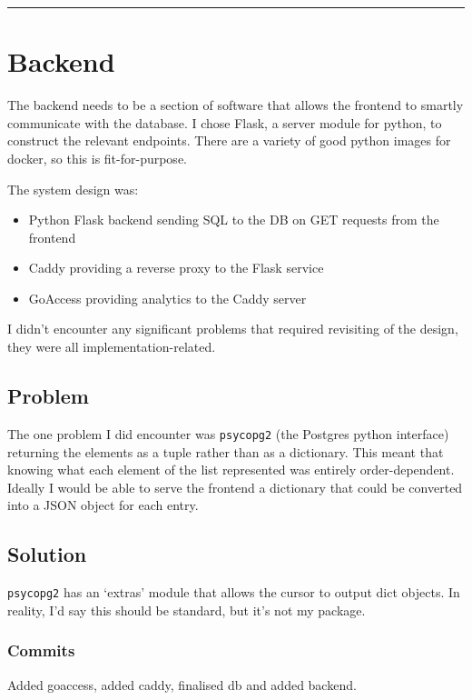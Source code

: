 \documentclass{article}
\begin{document}
\begin{center}
\rule{0.5\textwidth}{0.2pt}
\end{center}


\section{Backend}

The backend needs to be a section of software that allows the frontend to smartly communicate with the database. I chose Flask, a server module for python, to construct the relevant endpoints. There are a variety of good python images for docker, so this is fit-for-purpose.

The system design was:
\begin{itemize}
    \item Python Flask backend sending SQL to the DB on GET requests from the frontend
    \item Caddy providing a reverse proxy to the Flask service
    \item GoAccess providing analytics to the Caddy server
\end{itemize}

I didn't encounter any significant problems that required revisiting of the design, they were all implementation-related.

\subsection*{Problem}
The one problem I did encounter was \texttt{psycopg2} (the Postgres python interface) returning the elements as a tuple rather than as a dictionary. This meant that knowing what each element of the list represented was entirely order-dependent. Ideally I would be able to serve the frontend a dictionary that could be converted into a JSON object for each entry.
\subsection*{Solution}
\texttt{psycopg2} has an `extras' module that allows the cursor to output dict objects. In reality, I'd say this should be standard, but it's not my package.
\subsubsection*{Commits}
\begin{description}\small
    \item[\texttt{8fccc4d}]  Added goaccess, added caddy, finalised db and added backend.
\end{description}
\normalfont
\end{document}
